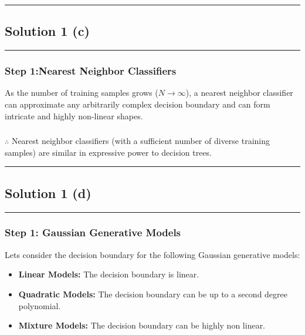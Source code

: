 \documentclass{article}
\begin{document}
\noindent\rule{\textwidth}{0.4pt}

\newpage

\subsection*{Solution 1 (c)}
\noindent\rule{\textwidth}{0.4pt}

\subsubsection*{Step 1:Nearest Neighbor Classifiers}

\parbox{\textwidth}{
As the number of training samples grows ($N \to \infty$), a nearest neighbor classifier can approximate any arbitrarily complex decision boundary and can form intricate and highly non-linear shapes.
}

\subsubsection*{\normalfont}{$\therefore$ Nearest neighbor classifiers (with a sufficient number of diverse training samples) are similar in expressive power to decision trees.}


\noindent\rule{\textwidth}{0.4pt}

\newpage

\subsection*{Solution 1 (d)}
\noindent\rule{\textwidth}{0.4pt}

\subsubsection*{Step 1: Gaussian Generative Models}
\parbox{\textwidth}{
Lets consider the decision boundary for the following Gaussian generative models:
\begin{itemize}
    \item \textbf{Linear Models:} The decision boundary is linear.
    \item \textbf{Quadratic Models:} The decision boundary can be up to a second degree polynomial.
    \item \textbf{Mixture Models:} The decision boundary can be highly non linear.
\end{itemize}
}
\end{document}
